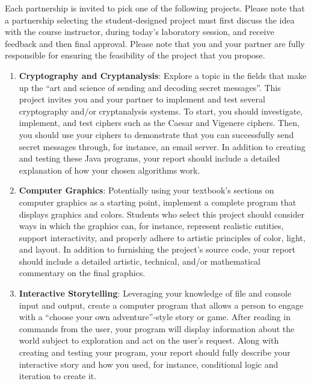 \documentclass[11pt]{article}
\begin{document}
Each partnership is invited to pick one of the following projects.  Please note that a partnership selecting the
student-designed project must first discuss the idea with the course instructor, during today's laboratory session, and
receive feedback and then final approval. Please note that you and your partner are fully responsible for ensuring the
feasibility of the project that you propose.

\begin{enumerate}

  \item {\bf Cryptography and Cryptanalysis}: Explore a topic in the fields that make up the ``art and science of
    sending and decoding secret messages''. This project invites you and your partner to implement and test several
    cryptography and/or cryptanalysis systems. To start, you should investigate, implement, and test ciphers such as
    the Caesar and Vigenere ciphers. Then, you should use your ciphers to demonstrate that you can successfully send
    secret messages through, for instance, an email server. In addition to creating and testing these Java programs,
    your report should include a detailed explanation of how your chosen algorithms work.

  \item {\bf Computer Graphics}: Potentially using your textbook's sections on computer graphics as a starting point,
    implement a complete program that displays graphics and colors. Students who select this project should consider
    ways in which the graphics can, for instance, represent realistic entities, support interactivity, and properly
    adhere to artistic principles of color, light, and layout. In addition to furnishing the project's source code, your
    report should include a detailed artistic, technical, and/or mathematical commentary on the final graphics.

  \item {\bf Interactive Storytelling}: Leveraging your knowledge of file and console input and output, create a
    computer program that allows a person to engage with a ``choose your own adventure''-style story or game. After
    reading in commands from the user, your program will display information about the world subject to exploration and
    act on the user's request. Along with creating and testing your program, your report should fully describe your
    interactive story and how you used, for instance, conditional logic and iteration to create it.


\end{enumerate}
\end{document}
